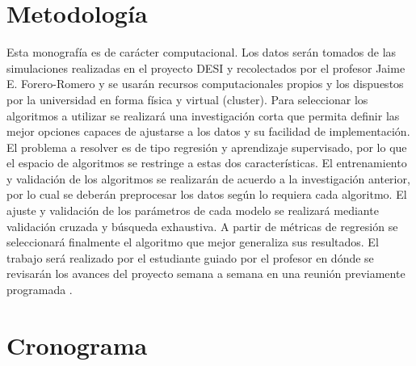 \documentclass[12pt]{article}
\begin{document}
\section{Metodología}




Esta monografía es de carácter computacional. Los datos serán tomados
de las simulaciones realizadas en el proyecto DESI y recolectados por
el profesor Jaime E. Forero-Romero y se usarán recursos
computacionales propios y los dispuestos por la universidad en forma
física y virtual (cluster). Para seleccionar los algoritmos a utilizar
se realizará una investigación corta que permita definir las mejor
opciones capaces de ajustarse a los datos y su facilidad de
implementación. El problema a resolver es de tipo regresión y
aprendizaje supervisado, por lo que el espacio de algoritmos se
restringe a estas dos características. El entrenamiento y validación
de los algoritmos se realizarán de acuerdo a la investigación
anterior, por lo cual se deberán preprocesar los datos según lo
requiera cada algoritmo. El ajuste y validación de los parámetros de
cada modelo se realizará mediante validación cruzada y búsqueda
exhaustiva. A partir de métricas de regresión se seleccionará
finalmente el algoritmo que mejor generaliza sus resultados. El
trabajo será realizado por el estudiante guiado por el profesor en
dónde se revisarán los avances del proyecto semana a semana en una
reunión previamente programada . 
\section{Cronograma}
\end{document}

